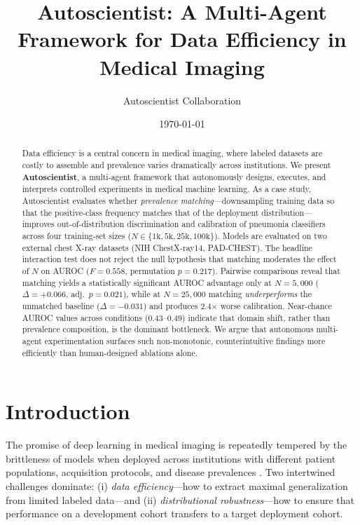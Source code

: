 \documentclass[11pt]{article}
\title{\textbf{Autoscientist: A Multi-Agent Framework for Data Efficiency in Medical Imaging}}
\author{Autoscientist Collaboration}
\date{\today}
\begin{document}
\maketitle

\begin{abstract}
Data efficiency is a central concern in medical imaging, where labeled datasets are costly to assemble and prevalence varies dramatically across institutions. We present \textbf{Autoscientist}, a multi-agent framework that autonomously designs, executes, and interprets controlled experiments in medical machine learning. As a case study, Autoscientist evaluates whether \emph{prevalence matching}---downsampling training data so that the positive-class frequency matches that of the deployment distribution---improves out-of-distribution discrimination and calibration of pneumonia classifiers across four training-set sizes ($N \in \{1\text{k}, 5\text{k}, 25\text{k}, 100\text{k}\}$). Models are evaluated on two external chest X-ray datasets (NIH ChestX-ray14, PAD-CHEST). The headline interaction test does not reject the null hypothesis that matching moderates the effect of $N$ on AUROC ($F = 0.558$, permutation $p = 0.217$). Pairwise comparisons reveal that matching yields a statistically significant AUROC advantage only at $N=5{,}000$ ($\Delta = +0.066$, adj.\ $p = 0.021$), while at $N=25{,}000$ matching \emph{underperforms} the unmatched baseline ($\Delta = -0.031$) and produces 2.4$\times$ worse calibration. Near-chance AUROC values across conditions ($0.43$--$0.49$) indicate that domain shift, rather than prevalence composition, is the dominant bottleneck. We argue that autonomous multi-agent experimentation surfaces such non-monotonic, counterintuitive findings more efficiently than human-designed ablations alone.
\end{abstract}

\section{Introduction}

The promise of deep learning in medical imaging is repeatedly tempered by the brittleness of models when deployed across institutions with different patient populations, acquisition protocols, and disease prevalences \cite{zech2018variable, finlayson2021clinician}. Two intertwined challenges dominate: (i) \emph{data efficiency}---how to extract maximal generalization from limited labeled data---and (ii) \emph{distributional robustness}---how to ensure that performance on a development cohort transfers to a target deployment cohort.
\end{document}

